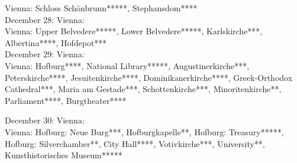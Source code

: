 Vienna: Schloss Sch\"onbrunn*****, Stephansdom****\\

December 28: Vienna: \\
Vienna: Upper Belvedere*****, Lower Belvedere*****, Karlskirche***, Albertina****, Hofdepot***\\

December 29: Vienna:\\
Vienna: Hofburg****, National Library*****, Augustinerkirche***, Peterskirche****, Jesuitenkirche****, Dominikanerkirche****, Greek-Orthodox Cathedral***, Maria am Gestade***, Schottenkirche***, Minoritenkirche**, Parliament****, Burgtheater****

December 30: Vienna:\\
Vienna: Hofburg: Neue Burg***, Hofburgkapelle**, Hofburg: Treasury*****, Hofburg: Silverchamber**, City Hall****, Votivkirche***, University**, Kunsthistorisches Museum*****